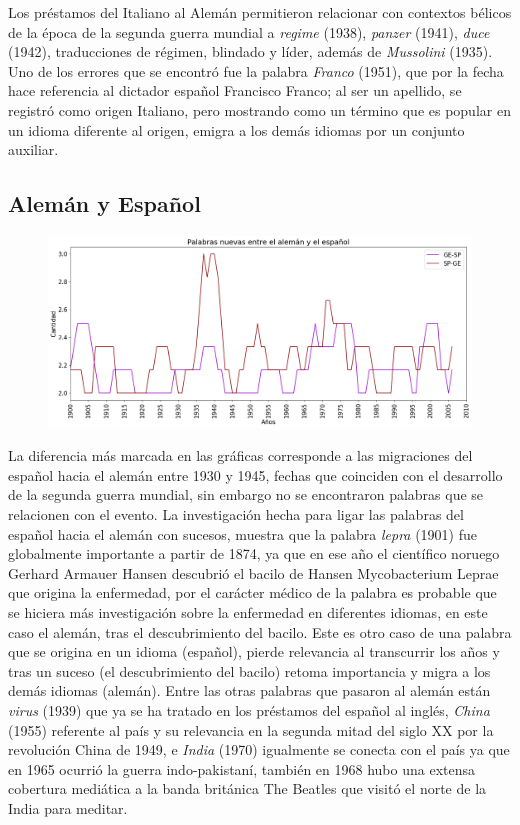 Los préstamos del Italiano al Alemán permitieron relacionar con contextos bélicos de la época de la segunda guerra mundial a \textit{regime} (1938), \textit{panzer} (1941), \textit{duce} (1942),  traducciones de régimen, blindado y líder, además de \textit{Mussolini} (1935).  Uno de los errores que se encontró fue la palabra \textit{Franco} (1951), que por la fecha hace referencia al dictador español Francisco Franco; al ser un apellido, se registró como origen Italiano, pero mostrando como un término que es popular en un idioma diferente al origen, emigra a los demás idiomas  por un conjunto auxiliar.


\subsection{Alemán y Español}

\begin{figure}[h!]
	\centering
	\includegraphics[scale=.38]{Cap_2/NC_4_S2_GE.png}
	\label{NC_GS}
	\caption{}
\end{figure}

La diferencia más marcada en las gráficas corresponde a las migraciones del español hacia el alemán entre 1930 y 1945, fechas que coinciden con el desarrollo de la segunda guerra mundial, sin embargo no se encontraron palabras que se relacionen con el evento.  La investigación hecha para ligar las palabras del español hacia el alemán con sucesos, muestra que la palabra \textit{lepra} (1901) fue globalmente importante a partir de 1874,  ya que en ese año el científico noruego Gerhard Armauer Hansen descubrió el bacilo de Hansen Mycobacterium Leprae \cite{lepra} que origina la enfermedad,  por el carácter médico de la palabra es probable que se hiciera más investigación sobre la enfermedad en diferentes idiomas, en este caso el alemán,  tras el descubrimiento del bacilo.  Este es otro caso de una palabra que se origina en un idioma (español), pierde  relevancia al transcurrir los años y tras un suceso (el descubrimiento del bacilo)  retoma importancia y migra a los demás idiomas (alemán).   Entre las otras palabras que pasaron al alemán están \textit{virus} (1939) que ya se ha tratado en los préstamos del español al inglés, \textit{China} (1955) referente al país y su relevancia en la segunda mitad del siglo XX por la revolución China de 1949, e \textit{India} (1970) igualmente se conecta con el país ya que en 1965 ocurrió la guerra indo-pakistaní,  también en 1968 hubo una extensa cobertura mediática a la banda británica The Beatles que visitó el norte de la India para meditar.


